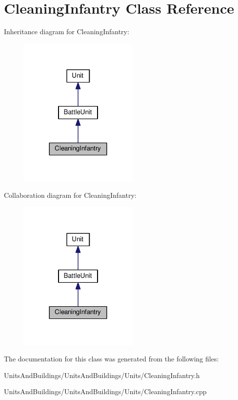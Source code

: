 \hypertarget{class_cleaning_infantry}{}\section{Cleaning\+Infantry Class Reference}
\label{class_cleaning_infantry}


Inheritance diagram for Cleaning\+Infantry\+:
\nopagebreak
\begin{figure}[H]
\begin{center}
\leavevmode
\includegraphics[width=168pt]{class_cleaning_infantry__inherit__graph}
\end{center}
\end{figure}


Collaboration diagram for Cleaning\+Infantry\+:
\nopagebreak
\begin{figure}[H]
\begin{center}
\leavevmode
\includegraphics[width=168pt]{class_cleaning_infantry__coll__graph}
\end{center}
\end{figure}


The documentation for this class was generated from the following files\+:\begin{DoxyCompactItemize}
\item 
Units\+And\+Buildings/\+Units\+And\+Buildings/\+Units/Cleaning\+Infantry.\+h\item 
Units\+And\+Buildings/\+Units\+And\+Buildings/\+Units/Cleaning\+Infantry.\+cpp\end{DoxyCompactItemize}
